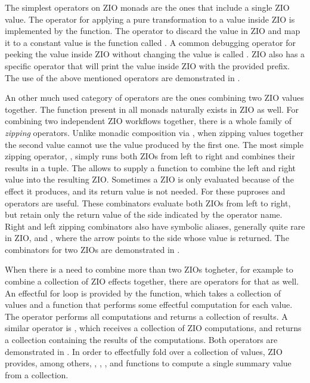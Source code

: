

The simplest operators on ZIO monads are the ones that include a single ZIO value. The operator for applying a pure transformation to a value inside ZIO is implemented by the  function. The operator to discard the value in ZIO and map it to a constant value is the function called . A common debugging operator for peeking the value inside ZIO without changing the value is called . ZIO also has a specific  operator that will print the value inside ZIO with the provided prefix. The use of the above mentioned operators are demonstrated in .



An other much used category of operators are the ones combining two ZIO values together. The  function present in all monads naturally exists in ZIO as well. For combining two independent ZIO workflows together, there is a whole family of \emph{zipping} operators. Unlike monadic composition via , when zipping values together the second value cannot use the value produced by the first one. The most simple zipping operator, , simply runs both ZIOs from left to right and combines their results in a tuple. The  allows to supply a function to combine the left and right value into the resulting ZIO. Sometimes a ZIO is only evaluated because of the effect it produces, and its return value is not needed. For these puproses  and  operators are useful. These combinators evaluate both ZIOs from left to right, but retain only the return value of the side indicated by the operator name. Right and left zipping combinators also have symbolic aliases, generally quite rare in ZIO, \inlinecode{*>} and \inlinecode{<*}, where the arrow points to the side whose value is returned. The combinators for two ZIOs are demonstrated in .



When there is a need to combine more than two ZIOs togheter, for example to combine a collection of ZIO effects together, there are operators for that as well. An effectful for loop is provided by the  function, which takes a collection of values and a function that performs some effectful computation for each value. The operator performs all computations and returns a collection of results. A similar operator is , which receives a collection of ZIO computations, and returns a collection containing the results of the computations. Both operators are demonstrated in . In order to effectfully fold over a collection of values, ZIO provides, among others, , , , and   functions to compute a single summary value from a collection.


